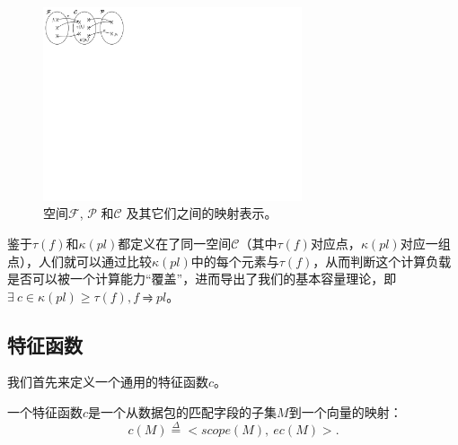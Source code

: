 
\begin{figure}[tbh]
    \centering
    \includegraphics[clip, trim=0in 8.5in 9.8in 0in, width=3in]{figures/function-spaces.pdf}
    \caption{空间$\mathcal{F}$, $\mathcal{P}$ 和$\mathcal{C}$ 及其它们之间的映射表示。}
    \label{cap:fig:function-spaces}
\end{figure}

鉴于$\tau(f)$和$\kappa(pl)$都定义在了同一空间$\mathcal{C}$（其中$\tau(f)$对应点，$\kappa(pl)$对应一组点），人们就可以通过比较$\kappa(pl)$中的每个元素与$\tau(f)$，从而判断这个计算负载是否可以被一个计算能力``覆盖''，进而导出了我们的基本容量理论，即$\exists\ c \in \kappa(pl) \geq \tau(f), f \rightrightharpoons pl$。


\subsection{特征函数}


我们首先来定义一个通用的特征函数$c$。
\begin{definition} 一个特征函数$c$是一个从数据包的匹配字段的子集$M$到一个向量的映射：  
\begin{equation*}
c(M) \overset{\Delta}{=} <scope(M),\ ec(M)>.
\end{equation*}
\end{definition}

